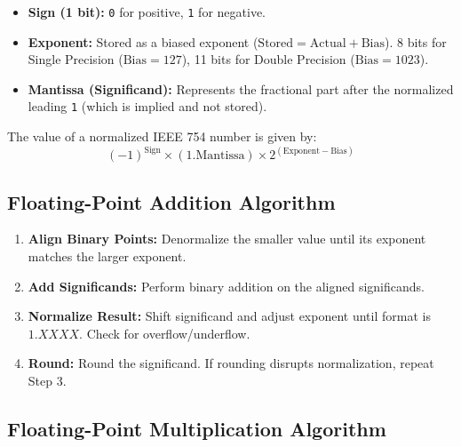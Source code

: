 \begin{definition}
\begin{itemize}
    \item \textbf{Sign (1 bit):} \texttt{0} for positive, \texttt{1} for negative.
    \item \textbf{Exponent:} Stored as a biased exponent ($\text{Stored} = \text{Actual} + \text{Bias}$). 8 bits for Single Precision ($\text{Bias}=127$), 11 bits for Double Precision ($\text{Bias}=1023$).
    \item \textbf{Mantissa (Significand):} Represents the fractional part after the normalized leading \texttt{1} (which is implied and not stored).
\end{itemize}
\end{definition}

\begin{proposition}
The value of a normalized IEEE 754 number is given by:
\begin{equation}
(-1)^{\text{Sign}} \times (1.\text{Mantissa}) \times 2^{(\text{Exponent} - \text{Bias})}
\end{equation}
\end{proposition}

\subsection{Floating-Point Addition Algorithm}

\begin{proposition}
\begin{enumerate}
    \item \textbf{Align Binary Points:} Denormalize the smaller value until its exponent matches the larger exponent.
    \item \textbf{Add Significands:} Perform binary addition on the aligned significands.
    \item \textbf{Normalize Result:} Shift significand and adjust exponent until format is $1.XXXX$. Check for overflow/underflow.
    \item \textbf{Round:} Round the significand. If rounding disrupts normalization, repeat Step 3.
\end{enumerate}
\end{proposition}

\subsection{Floating-Point Multiplication Algorithm}

